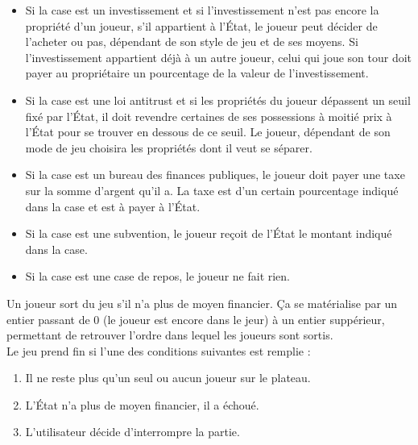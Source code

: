 \documentclass[11pt, a4paper]{report}
\begin{document}
	\begin{itemize}
		
		\item Si la case est un investissement et si l'investissement n'est pas encore la propriété d'un joueur, s'il appartient à l'État, le joueur peut décider de l'acheter ou pas, dépendant de son style de jeu et de ses moyens. Si l'investissement appartient déjà à un autre joueur, celui qui joue son tour doit payer au propriétaire un pourcentage de la valeur de l'investissement.
		
		\item Si la case est une loi antitrust et si les propriétés du joueur dépassent un seuil fixé par l'État, il doit revendre certaines de ses possessions à moitié prix à l'État pour se trouver en dessous de ce seuil. Le joueur, dépendant de son mode de jeu choisira les propriétés dont il veut se séparer.
		
		\item Si la case est un bureau des finances publiques, le joueur doit payer une taxe sur la somme d'argent qu'il a. La taxe est d'un certain pourcentage indiqué dans la case et est à payer à l'État.
		
		\item Si la case est une subvention, le joueur reçoit de l'État le montant indiqué dans la case.
		
		\item Si la case est une case de repos, le joueur ne fait rien.
		
	\end{itemize}
	Un joueur sort du jeu s'il n'a plus de moyen financier. Ça se matérialise par un entier passant de $0$ (le joueur est encore dans le jeur) à un entier suppérieur, permettant de retrouver l'ordre dans lequel les joueurs sont sortis.\\
	Le jeu prend fin si l'une des conditions suivantes est remplie :
	
	\begin{enumerate}
		
		\item Il ne reste plus qu'un seul ou aucun joueur sur le plateau.
		
		\item L'État n'a plus de moyen financier, il a échoué.
		
		\item L'utilisateur décide d'interrompre la partie.
		
	\end{enumerate}
	
\end{document}
